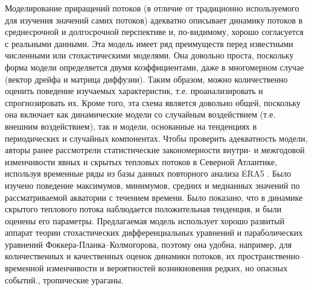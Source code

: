 Моделирование приращений потоков (в отличие от традиционно используемого для изучения значений самих потоков) адекватно описывает динамику потоков в среднесрочной и долгосрочной перспективе и, по-видимому, хорошо согласуется с реальными данными. Эта модель имеет ряд преимуществ перед известными численными или стохастическими моделями. Она довольно проста, поскольку форма модели определяется двумя коэффициентами, даже в многомерном случае (вектор дрейфа и матрица диффузии). Таким образом, можно количественно оценить поведение изучаемых характеристик, т.е. проанализировать и спрогнозировать их. Кроме того, эта схема является довольно общей, поскольку она включает как динамические модели со случайным воздействием (т.е. внешним воздействием), так и модели, основанные на тенденциях в периодических и случайных компонентах. Чтобы проверить адекватность модели, авторы ранее рассмотрели статистические закономерности внутри- и межгодовой изменчивости явных и скрытых тепловых потоков в Северной Атлантике, используя временные ряды из базы данных повторного анализа ERA5 \cite{Belyaev2022}. Было изучено поведение максимумов, минимумов, средних и медианных значений по рассматриваемой акватории с течением времени. Было показано, что в динамике скрытого теплового потока наблюдается положительная тенденция, и были оценены его параметры. Предлагаемая модель использует хорошо развитый аппарат теории стохастических дифференциальных уравнений и параболических уравнений Фоккера-Планка–Колмогорова, поэтому она удобна, например, для количественных и качественных оценок динамики потоков, их пространственно–временной изменчивости и вероятностей возникновения редких, но опасных событий., тропические ураганы.
